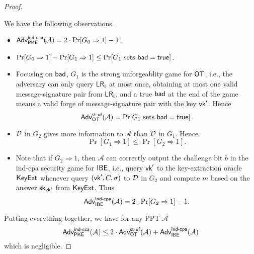 \documentclass[12pt]{article}
\newcommand{\getsr}{\stackrel{\$}{\gets}}
\newcommand{\Adv}{\textsf{Adv}}
\newcommand{\true}{\textsf{true}}
\theoremstyle{definition}
\newcommand{\PKE}{\textsf{PKE}}
\newcommand{\Kg}{\textsf{Kg}}
\newcommand{\sk}{\textsf{sk}}
\newcommand{\A}{\mathcal{A}}
\newcommand{\LR}{\textsf{LR}}
\begin{document}
\begin{proof}
\begin{itemize}
\end{itemize}
We have the following observations.
\begin{itemize}
\item $\Adv_{\PKE}^{\cca}(\A) = 2\cdot\Pr[G_0 \Rightarrow 1]-1$.
\item $\Pr[G_0 \Rightarrow 1] - \Pr[G_1 \Rightarrow 1] \leq \Pr[\textrm{$G_1$ sets $\bad = \true$}]$.
\item Focusing on $\textsf{bad}$, $G_1$ is the strong unforgeablity game for $\textsf{OT}$, i.e., the adversary can only query $\LR_b$ at most once, obtaining at most one valid message-signature pair from $\LR_b$, and a true $\textsf{bad}$ at the end of the game means a valid forge of message-signature pair with the key $\textsf{vk}'$. Hence
	$$\Adv_{\OT}^{\textsf{st-uf}}(\A) = \Pr[\textrm{$G_1$ sets $\bad = \true$}].$$
\item $\mathcal{D}$ in $G_2$ gives more information to $\A$ than $\mathcal{D}$ in $G_1$. Hence 
$$\Pr[G_1 \Rightarrow 1] \leq \Pr[G_2 \Rightarrow 1].$$
\item Note that if $G_2 \Rightarrow 1$, then $\A$ can correctly output the challenge bit $b$ in the ind-cpa security game for $\textsf{IBE}$, i.e., query $\textsf{vk}'$ to the key-extraction oracle $\textsf{KeyExt}$ whenever query $(\textsf{vk}', C,\sigma)$ to $\mathcal{D}$ in $G_2$ and compute $m$ based on the answer $\sk_{\vk'}$ from $\textsf{KeyExt}$. Thus 
$$\Adv_{\IBE}^{\cpa}(\A) = 2\cdot\Pr[G_2 \Rightarrow 1] - 1.$$
\end{itemize}
Putting everything together, we have for any PPT $\A$
$$\Adv_{\PKE}^{\cca}(\A) \leq 2\cdot\Adv_{\OT}^{\textsf{st-uf}}(\A) + \Adv_{\IBE}^{\cpa}(\A)$$
which is negligible.
\end{proof}
\end{document}

